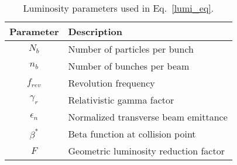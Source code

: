 \begin{table}[h]
\noindent \centering{}
\caption{Luminosity parameters used in Eq.~\eqref{lumi_eq}.}
\label{lumi_params}
\begin{tabular}{cl}
\hline
Parameter & Description\\
\hline
$N_{b}$ & Number of particles per bunch\\
$n_{b}$ & Number of bunches per beam\\
$f_{rev}$ & Revolution frequency\\
$\gamma_{r}$ & Relativistic gamma factor\\
$\epsilon_{n}$ & Normalized transverse beam emittance\\
$\beta^{*}$ & Beta function at collision point\\
$F$ & Geometric luminosity reduction factor\\
\hline
\end{tabular}
\end{table}
